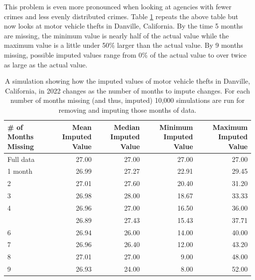 \documentclass[
  12pt,
  openany]{book}
\begin{document}
This problem is even more pronounced when looking at agencies with fewer crimes and less evenly distributed crimes. Table \ref{tab:countyDanvilleBurglaryMonthsMissing} repeats the above table but now looks at motor vehicle thefts in Danville, California. By the time 5 months are missing, the minimum value is nearly half of the actual value while the maximum value is a little under 50\% larger than the actual value. By 9 months missing, possible imputed values range from 0\% of the actual value to over twice as large as the actual value.

\begin{longtable}[t]{lrrrr}
\caption{\label{tab:countyDanvilleBurglaryMonthsMissing}A simulation showing how the imputed values of motor vehicle thefts in Danville, California, in 2022 changes as the number of months to impute changes. For each number of months missing (and thus, imputed) 10,000 simulations are run for removing and imputing those months of data.}\\
\toprule
\# of Months Missing & Mean Imputed Value & Median Imputed Value & Minimum Imputed Value & Maximum Imputed Value\\
\midrule
Full data & 27.00 & 27.00 & 27.00 & 27.00\\
1 month & 26.99 & 27.27 & 22.91 & 29.45\\
2 & 27.01 & 27.60 & 20.40 & 31.20\\
3 & 26.98 & 28.00 & 18.67 & 33.33\\
4 & 26.96 & 27.00 & 16.50 & 36.00\\
\addlinespace
5 & 26.89 & 27.43 & 15.43 & 37.71\\
6 & 26.94 & 26.00 & 14.00 & 40.00\\
7 & 26.96 & 26.40 & 12.00 & 43.20\\
8 & 27.01 & 27.00 & 9.00 & 48.00\\
9 & 26.93 & 24.00 & 8.00 & 52.00\\
\bottomrule
\end{longtable}
\end{document}
